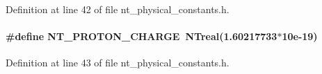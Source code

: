 Definition at line 42 of file nt\_\-physical\_\-constants.h.

\paragraph[{NT\_\-PROTON\_\-CHARGE}]{\setlength{\rightskip}{0pt plus 5cm}\#define NT\_\-PROTON\_\-CHARGE~{\bf NTreal}(1.60217733$\ast$10e-\/19)}\hfill\label{nt__physical__constants_8h_a5365829057a622adb8029986a2bb103e}


Definition at line 43 of file nt\_\-physical\_\-constants.h.

